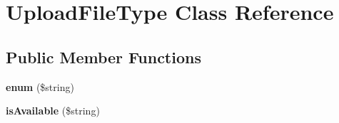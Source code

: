 \hypertarget{class_upload_file_type}{\section{Upload\+File\+Type Class Reference}
\label{class_upload_file_type}
}
\subsection*{Public Member Functions}
\begin{DoxyCompactItemize}
\item 
\hypertarget{class_upload_file_type_a7967c6e825979f8b2faefba3d95c3821}{{\bfseries enum} (\$string)}\label{class_upload_file_type_a7967c6e825979f8b2faefba3d95c3821}

\item 
\hypertarget{class_upload_file_type_a30537daeb912ea3e348c579c4f930841}{{\bfseries is\+Available} (\$string)}\label{class_upload_file_type_a30537daeb912ea3e348c579c4f930841}

\end{DoxyCompactItemize}
